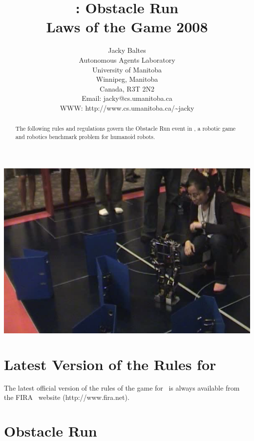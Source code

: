 \documentclass[12pt]{hurocup}
\begin{document}
\title{\HuroCup: Obstacle Run\\
  Laws of the Game 2008}


\author{Jacky Baltes\\
Autonomous Agents Laboratory\\
University of Manitoba\\
Winnipeg, Manitoba\\
Canada, R3T 2N2\\
Email: jacky@cs.umanitoba.ca\\
WWW: http://www.cs.umanitoba.ca/\~{ }jacky
}

\maketitle

\begin{center}
 \includegraphics[width=0.7\linewidth]{Figures/obstacle-run-life}
\end{center}

\begin{abstract}
The following rules and regulations govern the Obstacle Run event in
\HuroCup, a robotic game and robotics benchmark problem for humanoid
robots.
%
\end{abstract}

\section*{Latest Version of the Rules for \HuroCup}
\label{sec:updates}

The latest official version of the rules of the game for \HuroCup\ is
always available from the FIRA \HuroCup\ website (http://www.fira.net).

\newpage

\section{Obstacle Run}
\label{subsec:obstacle-run} 
\end{document}
